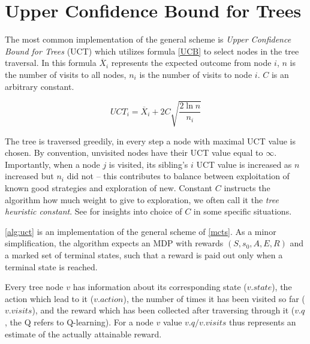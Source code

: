 \pagebreak


\section{Upper Confidence Bound for Trees}

The most common implementation of the general scheme is {\em Upper
Confidence Bound for Trees} (UCT) which utilizes formula \ref{UCB} to
select nodes in the tree traversal.
In this formula $\overline{X}_i$ represents the expected outcome
from node $i$, $n$ is the number of visits to all nodes, $n_i$ is the
number of visits to node $i$. $C$ is an arbitrary constant.

\begin{equation}
\label{UCB}
UCT_i = \overline{X}_i + 2 C \sqrt{ \frac{2 \ln n}{n_i} }
\end{equation}

The tree is traversed greedily, in every step a node with maximal UCT
value is chosen. By convention, unvisited nodes have their UCT value
equal to $\infty$.  Importantly, when a node $j$ is visited, its
sibling's $i$ UCT value is increased as $n$ increased but $n_i$ did not
-- this contributes to balance between exploitation of known good
strategies and exploration of new.  Constant $C$ instructs the algorithm
how much weight to give to exploration, we often call it the
{\em tree heuristic constant}. See \parencite{improved_mc} for
insights into choice of $C$ in some specific situations.

\autoref{alg:uct} is an implementation of the general scheme of \autoref{mcts}.
As a minor simplification, the algorithm expects an MDP with rewards
$(S,s_0,A,E,R)$ and a marked set of terminal states, such that a reward
is paid out only when a terminal state is reached.

Every tree node $v$ has information about its corresponding state
($v.state$), the action which lead to it ($v.action$), the number of
times it has been visited so far ($v.visits$), and the reward which has
been collected after traversing through it ($v.q$, the Q refers to
Q-learning). For a node $v$ value $v.q / v.visits$ thus represents an
estimate of the actually attainable reward.

